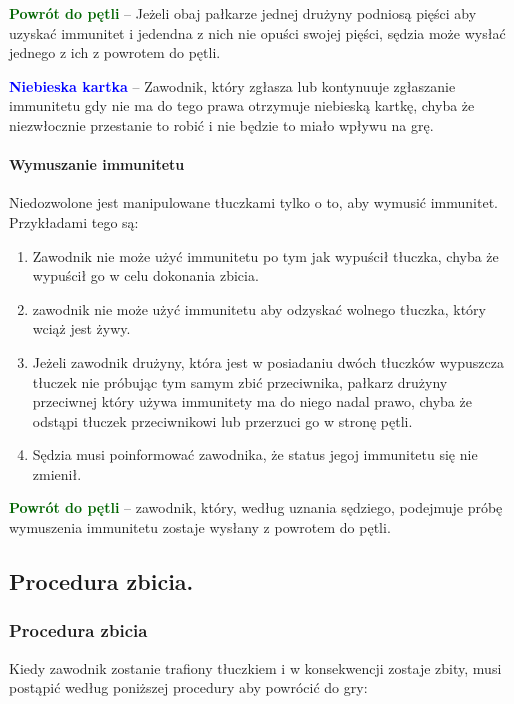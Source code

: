 \documentclass[12pt]{article}
\newcommand\bluecard[1]{\bgroup\textcolor{blue}{\textbf{#1}}}
\newcommand\other[1]{\bgroup\textcolor{darkgreen}{\textbf{#1}}}
\begin{document}
\other{Powrót do pętli} -- Jeżeli obaj pałkarze jednej drużyny podniosą
pięści aby uzyskać immunitet i jedendna z nich nie opuści swojej pięści,
sędzia może wysłać jednego z ich z powrotem do pętli.

\bluecard{Niebieska kartka} -- Zawodnik, który zgłasza lub kontynuuje
zgłaszanie immunitetu gdy nie ma do tego prawa otrzymuje niebieską
kartkę, chyba że niezwłocznie przestanie to robić i nie będzie to miało
wpływu na grę.

\paragraph{Wymuszanie immunitetu}
Niedozwolone jest manipulowane
tłuczkami tylko o to, aby wymusić immunitet. Przykładami tego są:

\begin{enumerate}
	\item
	      Zawodnik nie może użyć immunitetu po tym jak wypuścił tłuczka, chyba
	      że wypuścił go w celu dokonania zbicia.
	\item
	      zawodnik nie może użyć immunitetu aby odzyskać wolnego tłuczka, który
	      wciąż jest żywy.
	\item
	      Jeżeli zawodnik drużyny, która jest w posiadaniu dwóch tłuczków
	      wypuszcza tłuczek nie próbując tym samym zbić przeciwnika, pałkarz
	      drużyny przeciwnej który używa immunitety ma do niego nadal prawo,
	      chyba że odstąpi tłuczek przeciwnikowi lub przerzuci go w stronę
	      pętli.
	\item
	      Sędzia musi poinformować zawodnika, że status jegoj immunitetu się nie
	      zmienił.
\end{enumerate}

\other{Powrót do pętli} -- zawodnik, który, według uznania sędziego,
podejmuje próbę wymuszenia immunitetu zostaje wysłany z powrotem do
pętli.

\subsection{Procedura zbicia.}

\subsubsection{Procedura zbicia}

Kiedy zawodnik zostanie trafiony tłuczkiem i w konsekwencji zostaje
zbity, musi postąpić według poniższej procedury aby powrócić do gry:
\end{document}
